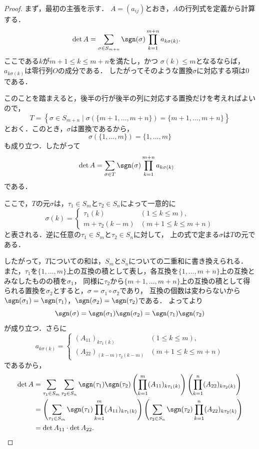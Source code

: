 \begin{tleftbar}
\begin{proof}
  まず，最初の主張を示す．
  $A=(a_{ij})$とおき，$A$の行列式を定義から計算する．
  \begin{align*}
    \det A
    &=
    \sum_{\sigma \in S_{m+n}} \sgn(\sigma)
    \prod_{k=1}^{m+n} a_{k\sigma(k)}.
  \end{align*}
  ここである$k$が$m+1 \le k \le m+n$を満たし，かつ
  $\sigma(k) \le m$となるならば，$a_{k\sigma(k)}$は零行列$O$の成分である．
  したがってそのような置換$\sigma$に対応する項は$0$である．

  このことを踏まえると，後半の行が後半の列に対応する置換だけを考えればよいので，
  \[
    T=
    \left\{
      \sigma \in S_{m+n}
      \mid
      \sigma(\{m+1,\dots,m+n\})=\{m+1,\dots,m+n\}
    \right\}
  \]
  とおく．このとき，$\sigma$は置換であるから，
  \[
    \sigma(\{1,\dots,m\})=\{1,\dots,m\}
  \]
  も成り立つ．したがって
  \begin{align*}
    \det A
    &=
    \sum_{\sigma \in T}
    \sgn(\sigma)
    \prod_{k=1}^{m+n} a_{k\sigma(k)}
  \end{align*}
  である．

  ここで，$T$の元$\sigma$は，$\tau_1 \in S_m$と$\tau_2 \in S_n$によって一意的に
  \[
    \sigma(k) =
    \begin{cases}
      \tau_1(k) & (1 \le k \le m),\\
      m + \tau_2(k-m) & (m+1 \le k \le m+n)
    \end{cases}
  \]
  と表される．逆に任意の$\tau_1 \in S_m$と$\tau_2 \in S_n$に対して，
  上の式で定まる$\sigma$は$T$の元である．

  したがって，$T$についての和は，$S_m$と$S_n$についての二重和に書き換えられる．
  また，$\tau_1$を$\{1, \dots, m\}$上の互換の積として表し，各互換を$\{1, \dots, m+n\}$上の互換とみなしたものの積を$\sigma_1$，
  同様に$\tau_2$から$\{m+1, \dots, m+n\}$上の互換の積として得られる置換を$\sigma_2$とすると，$\sigma = \sigma_1 \circ \sigma_2$であり，
  互換の個数は変わらないから$\sgn(\sigma_1) = \sgn(\tau_1)$，$\sgn(\sigma_2) = \sgn(\tau_2)$である．
  よってより
  \[
    \sgn(\sigma)=\sgn(\sigma_1)\sgn(\sigma_2)=\sgn(\tau_1)\sgn(\tau_2)
  \]
  が成り立つ．さらに
  \[
    a_{k\sigma(k)} =
    \begin{cases}
      (A_{11})_{k\tau_1(k)} & (1 \le k \le m),\\
      (A_{22})_{(k-m)\tau_2(k-m)} & (m+1 \le k \le m+n)
    \end{cases}
  \]
  であるから，
  \begin{align*}
    \det A
    &=
    \sum_{\tau_1\in S_m}
    \sum_{\tau_2\in S_n}
    \sgn(\tau_1)\sgn(\tau_2)
    \left(
      \prod_{k=1}^{m} (A_{11})_{k\tau_1(k)}
    \right)
    \left(
      \prod_{k=1}^{n} (A_{22})_{k\tau_2(k)}
    \right) \\
    &=
    \left(
      \sum_{\tau_1\in S_m}
      \sgn(\tau_1)
      \prod_{k=1}^{m} (A_{11})_{k\tau_1(k)}
    \right)
    \left(
      \sum_{\tau_2\in S_n}
      \sgn(\tau_2)
      \prod_{k=1}^{n} (A_{22})_{k\tau_2(k)}
    \right) \\
    &= \det A_{11} \cdot \det A_{22}.
  \end{align*}


\end{proof}
\end{tleftbar}

